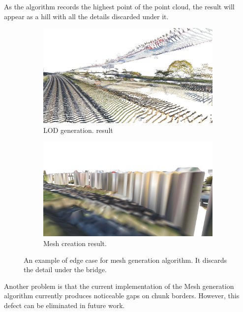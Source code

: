 As the algorithm records the highest point of the point cloud, the result will appear as a hill with all the details discarded under it.

\begin{figure}[h]
    \centering
    
    \begin{subfigure}{0.45\textwidth}
        \centering
        \includegraphics[width=\textwidth]{lod-edgecase.jpg}
        \caption{LOD generation. result}
    \end{subfigure}
    \begin{subfigure}{0.45\textwidth}
        \centering
        \includegraphics[width=\textwidth]{mesh-edgecase.jpg}
        \caption{Mesh creation result.}
    \end{subfigure}
    
    \caption{An example of edge case for mesh generation algorithm. It discards the detail under the bridge.}
    \label{fig:results:mesh-edgecase}
\end{figure}

Another problem is that the current implementation of the Mesh generation algorithm currently produces noticeable gaps on chunk borders. However, this defect can be eliminated in future work.

